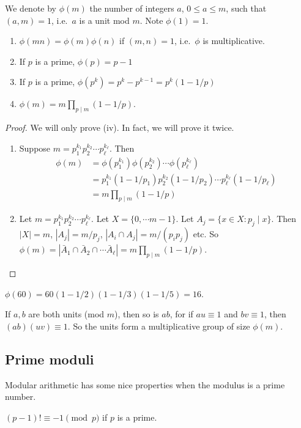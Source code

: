 \documentclass[a4paper]{article}
\begin{document}
\begin{defi}
  We denote by $\phi(m)$ the number of integers $a$, $0\leq a\leq m$, such that $(a, m) = 1$, i.e.\ $a$ is a unit mod $m$. Note $\phi(1) = 1$.
\end{defi}

\begin{prop}\leavevmode
  \begin{enumerate}
    \item $\phi(mn) = \phi(m)\phi(n)$ if $(m, n) = 1$, i.e.\ $\phi$ is multiplicative.
    \item If $p$ is a prime, $\phi(p) = p - 1$
    \item If $p$ is a prime, $\phi(p^k) = p^k - p^{k - 1} = p^k(1 - 1/p)$
    \item $\phi(m) = m\prod_{p \mid m}(1 - 1/p)$.
  \end{enumerate}
\end{prop}

\begin{proof}
  We will only prove (iv). In fact, we will prove it twice.
  \begin{enumerate}
    \item Suppose $m = p_1^{k_1}p_2^{k_2}\cdots p_\ell^{k_\ell}$. Then
      \begin{align*}
        \phi(m) &= \phi(p_1^{k_1})\phi(p_2^{k_2})\cdots \phi(p_\ell^{k_\ell})\\
        &= p_1^{k_1}(1-1/p_1)p_2^{k_2}(1 - 1/p_2)\cdots p_\ell^{k_\ell}(1 - 1/p_\ell)\\
        &= m\prod_{p \mid m}(1 - 1/p)
      \end{align*}
    \item Let $m = p_1^{k_1}p_2^{k_2}\cdots p_\ell^{k_\ell}$. Let $X = \{0, \cdots m - 1\}$. Let $A_j = \{x\in X: p_j\mid x\}$. Then $|X| = m$, $|A_j| = m/p_j$, $|A_i\cap A_j| = m/(p_ip_j)$ etc. So $\phi(m) = |\bar A_1\cap \bar A_2\cap \cdots \bar A_\ell| = m\prod_{p \mid m}(1 - 1/p)$.\qedhere
  \end{enumerate}
\end{proof}

\begin{eg}
  $\phi(60) = 60(1 - 1/2)(1 - 1/3)(1 - 1/5) = 16$.
\end{eg}

If $a, b$ are both units (mod $m$), then so is $ab$, for if $au \equiv 1$ and $bv \equiv 1$, then $(ab)(uv)\equiv 1$. So the units form a multiplicative group of size $\phi(m)$.

\subsection{Prime moduli}
Modular arithmetic has some nice properties when the modulus is a prime number.
\begin{thm}
  $(p - 1)! \equiv -1\pmod p$ if $p$ is a prime.
\end{thm}
\end{document}
